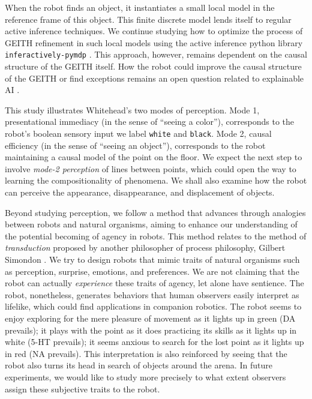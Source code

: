\documentclass[runningheads]{llncs}
\begin{document}
When the robot finds an object, it instantiates a small local model in the reference frame of this object. 
This finite discrete model lends itself to regular active inference techniques. 
We continue studying how to optimize the process of GEITH refinement in such local models using the active inference python library  \texttt{inferac\-tively-pymdp} \cite{Heins2022}.
This approach, however, remains dependent on the causal structure of the GEITH itself.
How the robot could improve the causal structure of the GEITH or find exceptions remains an open question related to explainable AI \cite{thorisson_explanation_2021}.

This study illustrates Whitehead's two modes of perception. 
Mode 1, presentational immediacy (in the sense of ``seeing a color''), corresponds to the robot's boolean sensory input we label \texttt{white} and \texttt{black}. 
Mode 2, causal efficiency (in the sense of ``seeing an object''), corresponds to the robot maintaining a causal model of the point on the floor. 
We expect the next step to involve \textit{ mode-2 perception} of lines between points, which could open the way to learning the compositionality of phenomena. 
We shall also examine how the robot can perceive the appearance, disappearance, and displacement of objects. 

Beyond studying perception, we follow a method that advances through analogies between robots and natural organisms, aiming to enhance our understanding of the potential becoming of agency in robots. 
This method relates to the method of \textit{transduction} proposed by another philosopher of process philosophy, Gilbert Simondon \cite{simondon_individuation_2005}.
We try to design robots that mimic traits of natural organisms such as perception, surprise, emotions, and preferences.
We are not claiming that the robot can actually \textit{experience} these traits of agency, let alone have sentience. 
The robot, nonetheless, generates behaviors that human observers easily interpret as lifelike, which could find applications in companion robotics.
The robot seems to enjoy exploring for the mere pleasure of movement as it lights up in green (DA prevails); 
it plays with the point as it does practicing its skills as it lights up in white (5-HT prevails); 
it seems anxious to search for the lost point as it lights up in red (NA prevails). 
This interpretation is also reinforced by seeing that the robot also turns its head in search of objects around the arena.
In future experiments, we would like to study more precisely to what extent observers assign these subjective traits to the robot.
\end{document}
